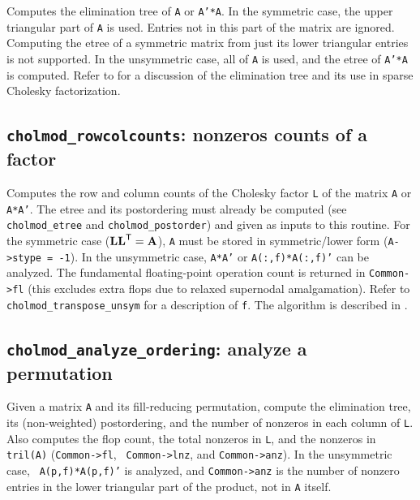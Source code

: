 \documentclass[11pt]{article}
\newcommand{\m}[1]{{\bf{#1}}}       %
\newcommand{\tr}{^{\sf T}}          %
\begin{document}

Computes the elimination tree of {\tt A} or {\tt A'*A}.  In the symmetric case,
the upper triangular part of {\tt A} is used.  Entries not in this part of the
matrix are ignored.  Computing the etree of a symmetric matrix from just its
lower triangular entries is not supported.  In the unsymmetric case, all of
{\tt A} is used, and the etree of {\tt A'*A} is computed.  Refer to
\cite{Liu90a} for a discussion of the elimination tree and its use in sparse
Cholesky factorization.

\subsection{{\tt cholmod\_rowcolcounts}: nonzeros counts of a factor}


Computes the row and column counts of the Cholesky factor {\tt L} of the matrix
{\tt A} or {\tt A*A'}.  The etree and its postordering must already be computed
(see {\tt cholmod\_etree} and {\tt cholmod\_postorder}) and given as inputs to
this routine.  For the symmetric case ($\m{LL}\tr=\m{A}$), {\tt A} must be
stored in symmetric/lower form ({\tt A->stype = -1}).  In the unsymmetric case,
{\tt A*A'} or {\tt A(:,f)*A(:,f)'} can be analyzed.  The fundamental
floating-point operation count is returned in {\tt Common->fl} (this excludes
extra flops due to relaxed supernodal amalgamation).  Refer to {\tt
cholmod\_transpose\_unsym} for a description of {\tt f}.  The algorithm is
described in \cite{GilbertLiNgPeyton01,GilbertNgPeyton94}.

%

\subsection{{\tt cholmod\_analyze\_ordering}: analyze a permutation}


Given a matrix {\tt A} and its fill-reducing permutation, compute the
elimination tree, its (non-weighted) postordering, and the number of nonzeros
in each column of {\tt L}.  Also computes the flop count, the total nonzeros in
{\tt L}, and the nonzeros in {\tt tril(A)} ({\tt Common->fl}, {\tt
Common->lnz}, and {\tt Common->anz}).  In the unsymmetric case, {\tt
A(p,f)*A(p,f)'} is analyzed, and {\tt Common->anz} is the number of nonzero
entries in the lower triangular part of the product, not in {\tt A} itself.
\end{document}

